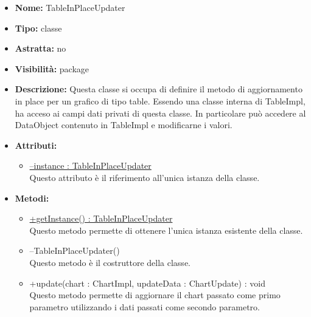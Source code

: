 	
			
			\begin{itemize}
			\item \textbf{Nome:} TableInPlaceUpdater
			\item \textbf{Tipo:} classe
			
		\item \textbf{Astratta:}
		no
			\item \textbf{Visibilità:} package
			\item \textbf{Descrizione:} Questa classe si occupa di definire il metodo di aggiornamento in place per un grafico di tipo table. Essendo una classe interna di TableImpl, ha acceso ai campi dati privati di questa classe. In particolare può accedere al DataObject contenuto in TableImpl e modificarne i valori.
			\item \textbf{Attributi:}
				\begin{itemize}
				\setlength{\itemsep}{5pt}
				
					\item[\ding{111}] \underline{--instance : TableInPlaceUpdater} \\ [1mm] Questo attributo è il riferimento all'unica istanza della classe.
				\end{itemize}
		
			\item \textbf{Metodi:}
				\begin{itemize}
				\setlength{\itemsep}{5pt}
				
					\item[\ding{111}] {\underline{+getInstance() : TableInPlaceUpdater}} \\ [1mm] Questo metodo permette di ottenere l'unica istanza esistente della classe.
					\item[\ding{111}] {{--TableInPlaceUpdater()}} \\ [1mm] Questo metodo è il costruttore della classe.
					\item[\ding{111}] {{+update(chart : ChartImpl, updateData : ChartUpdate) : void}} \\ [1mm] Questo metodo permette di aggiornare il chart passato come primo parametro utilizzando i dati passati come secondo parametro.
				\end{itemize}
		
			\end{itemize}


